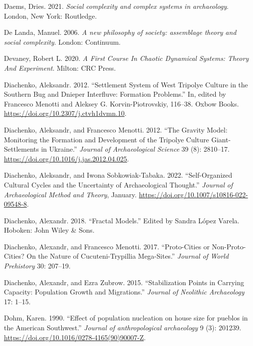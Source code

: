 \documentclass[
  12pt,
  a4paper, twoside]{book}
\newlength{\cslhangindent}
\newlength{\cslentryspacingunit} %
\newenvironment{CSLReferences}[2] %
 {%
  \setlength{\parindent}{0pt}
  \ifodd #1
  \let\oldpar\par
  \def\par{\hangindent=\cslhangindent\oldpar}
  \fi
  \setlength{\parskip}{#2\cslentryspacingunit}
 }%
 {}
\begin{document}
\begin{CSLReferences}{1}{0}
\leavevmode{}%
Daems, Dries. 2021. \emph{Social complexity and complex systems in archaeology}. London, New York: Routledge.

\leavevmode{}%
De Landa, Manuel. 2006. \emph{A new philosophy of society: assemblage theory and social complexity}. London: Continuum.

\leavevmode{}%
Devaney, Robert L. 2020. \emph{A First Course In Chaotic Dynamical Systems: Theory And Experiment}. Milton: CRC Press.

\leavevmode{}%
Diachenko, Aleksandr. 2012. {``Settlement System of West Tripolye Culture in the Southern Bug and Dnieper Interfluve: Formation Problems.''} In, edited by Francesco Menotti and Aleksey G. Korvin-Piotrovskiy, 116--38. Oxbow Books. \url{https://doi.org/10.2307/j.ctvh1dvmn.10}.

\leavevmode{}%
Diachenko, Aleksandr, and Francesco Menotti. 2012. {``The Gravity Model: Monitoring the Formation and Development of the Tripolye Culture Giant-Settlements in Ukraine.''} \emph{Journal of Archaeological Science} 39 (8): 2810--17. \url{https://doi.org/10.1016/j.jas.2012.04.025}.

\leavevmode{}%
Diachenko, Aleksandr, and Iwona Sobkowiak-Tabaka. 2022. {``Self-{Organized Cultural Cycles} and the {Uncertainty} of {Archaeological Thought}.''} \emph{Journal of Archaeological Method and Theory}, January. \url{https://doi.org/10.1007/s10816-022-09548-8}.

\leavevmode{}%
Diachenko, Alexandr. 2018. {``Fractal Models.''} Edited by Sandra López Varela. Hoboken: John Wiley \& Sons.

\leavevmode{}%
Diachenko, Alexandr, and Francesco Menotti. 2017. {``Proto-Cities or Non-Proto-Cities? On the Nature of Cucuteni-Trypillia Mega-Sites.''} \emph{Journal of World Prehistory} 30: 207--19.

\leavevmode{}%
Diachenko, Alexandr, and Ezra Zubrow. 2015. {``Stabilization Points in Carrying Capacity: Population Growth and Migrations.''} \emph{Journal of Neolithic Archaeology} 17: 1--15.

\leavevmode{}%
Dohm, Karen. 1990. {``Effect of population nucleation on house size for pueblos in the American Southwest.''} \emph{Journal of anthropological archaeology} 9 (3): 201239. \url{https://doi.org/10.1016/0278-4165(90)90007-Z}.


\end{CSLReferences}
\end{document}
